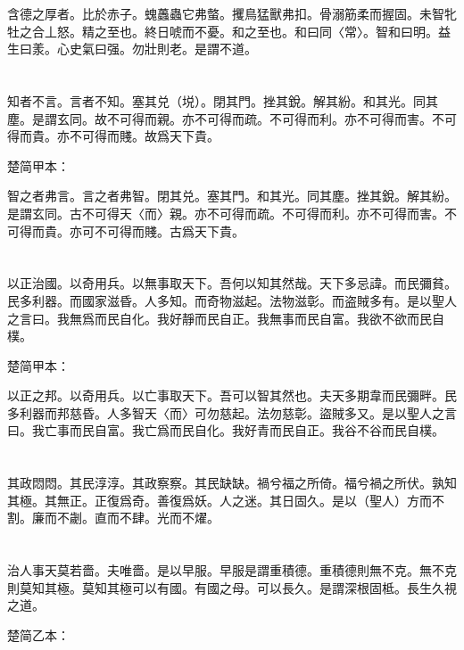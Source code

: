 \documentclass[a5paper]{ctexbook}
\begin{document}
    含德之厚者。比於赤子。螝䘍蟲它弗螫。攫鳥猛獸弗扣。骨溺筋柔而握固。未智牝牡之合丄怒。精之至也。終日唬而不憂。和之至也。和曰同〈常〉。智和曰明。益生曰羕。心史氣曰强。勿壯則老。是謂不道。

    \chapter{}

    知者不言。言者不知。塞其兑（㙂）。閉其門。挫其銳。解其紛。和其光。同其塵。是謂玄同。故不可得而親。亦不可得而疏。不可得而利。亦不可得而害。不可得而貴。亦不可得而賤。故爲天下貴。

    楚简甲本：

    智之者弗言。言之者弗智。閉其兑。塞其門。和其光。同其塵。挫其銳。解其紛。是謂玄同。古不可得天〈而〉親。亦不可得而疏。不可得而利。亦不可得而害。不可得而貴。亦可不可得而賤。古爲天下貴。

    \chapter{}

    以正治國。以奇用兵。以無事取天下。吾何以知其然哉。天下多忌諱。而民彌貧。民多利器。而國家滋昏。人多知。而奇物滋起。法物滋彰。而盗賊多有。是以聖人之言曰。我無爲而民自化。我好靜而民自正。我無事而民自富。我欲不欲而民自樸。

    楚简甲本：

    以正之邦。以奇用兵。以亡事取天下。吾可以智其然也。夫天多期韋而民彌畔。民多利器而邦慈昏。人多智天〈而〉可勿慈起。法勿慈彰。盜賊多又。是以聖人之言曰。我亡事而民自富。我亡爲而民自化。我好青而民自正。我谷不谷而民自樸。

    \chapter{}

    其政悶悶。其民淳淳。其政察察。其民缺缺。禍兮福之所倚。福兮禍之所伏。孰知其極。其無正。正復爲奇。善復爲妖。人之迷。其日固久。是以（聖人）方而不割。廉而不劌。直而不肆。光而不燿。

    \chapter{}

    治人事天莫若嗇。夫唯嗇。是以早服。早服是謂重積德。重積德則無不克。無不克則莫知其極。莫知其極可以有國。有國之母。可以長久。是謂深根固柢。長生久視之道。

    楚简乙本：
\end{document}
